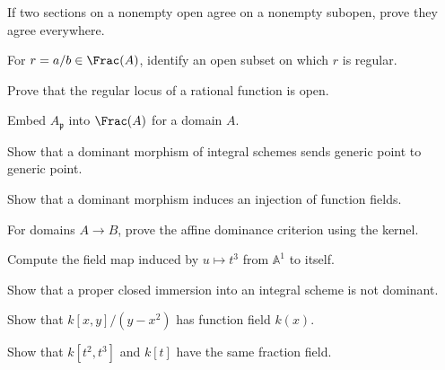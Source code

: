 \begin{exercise}\label{exer:vi27-12}If two sections on a nonempty open agree on a nonempty subopen, prove they agree everywhere.\end{exercise}

\begin{exercise}\label{exer:vi27-13}For $r=a/b\in\Frac(A)$, identify an open subset on which $r$ is regular.\end{exercise}

\begin{exercise}\label{exer:vi27-14}Prove that the regular locus of a rational function is open.\end{exercise}

\begin{exercise}\label{exer:vi27-15}Embed $A_{\mathfrak p}$ into $\Frac(A)$ for a domain $A$.\end{exercise}

\begin{exercise}\label{exer:vi27-16}Show that a dominant morphism of integral schemes sends generic point to generic point.\end{exercise}

\begin{exercise}\label{exer:vi27-17}Show that a dominant morphism induces an injection of function fields.\end{exercise}

\begin{exercise}\label{exer:vi27-18}For domains $A\to B$, prove the affine dominance criterion using the kernel.\end{exercise}

\begin{exercise}\label{exer:vi27-19}Compute the field map induced by $u\mapsto t^3$ from $\mathbb A^1$ to itself.\end{exercise}

\begin{exercise}\label{exer:vi27-20}Show that a proper closed immersion into an integral scheme is not dominant.\end{exercise}

\begin{exercise}\label{exer:vi27-21}Show that $k[x,y]/(y-x^2)$ has function field $k(x)$.\end{exercise}

\begin{exercise}\label{exer:vi27-22}Show that $k[t^2,t^3]$ and $k[t]$ have the same fraction field.\end{exercise}

